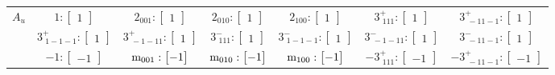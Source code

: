 \documentclass[fleqn,8pt,landscape]{jsarticle}
\begin{document}
\begin{longtable}{ccccccc}
$ A_{u} $ & $ 1:\begin{bmatrix} 1 \end{bmatrix} $ & $ 2{}_{001}:\begin{bmatrix} 1 \end{bmatrix} $ & $ 2{}_{010}:\begin{bmatrix} 1 \end{bmatrix} $ & $ 2{}_{100}:\begin{bmatrix} 1 \end{bmatrix} $ & $ 3^{+}_{\,\,111}:\begin{bmatrix} 1 \end{bmatrix} $ & $ 3^{+}_{\,\,-11-1}:\begin{bmatrix} 1 \end{bmatrix} $ \\
& $ 3^{+}_{\,\,1-1-1}:\begin{bmatrix} 1 \end{bmatrix} $ & $ 3^{+}_{\,\,-1-11}:\begin{bmatrix} 1 \end{bmatrix} $ & $ 3^{-}_{\,\,111}:\begin{bmatrix} 1 \end{bmatrix} $ & $ 3^{-}_{\,\,1-1-1}:\begin{bmatrix} 1 \end{bmatrix} $ & $ 3^{-}_{\,\,-1-11}:\begin{bmatrix} 1 \end{bmatrix} $ & $ 3^{-}_{\,\,-11-1}:\begin{bmatrix} 1 \end{bmatrix} $ \\
& $ -1:\begin{bmatrix} -1 \end{bmatrix} $ & $ {\rm m}_{001}:\begin{bmatrix} -1 \end{bmatrix} $ & $ {\rm m}_{010}:\begin{bmatrix} -1 \end{bmatrix} $ & $ {\rm m}_{100}:\begin{bmatrix} -1 \end{bmatrix} $ & $ -3^{+}_{\,\,111}:\begin{bmatrix} -1 \end{bmatrix} $ & $ -3^{+}_{\,\,-11-1}:\begin{bmatrix} -1 \end{bmatrix} $ \\

\end{longtable}
\end{document}
